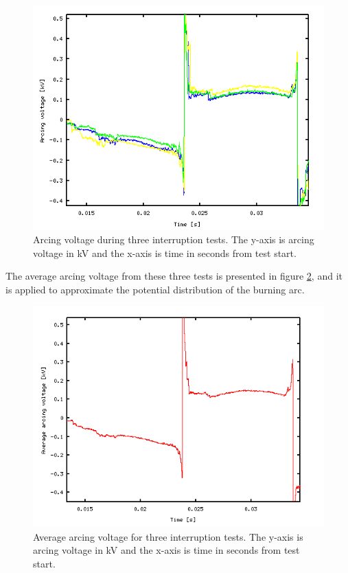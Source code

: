 \documentclass[10pt,b5paper,twoside]{article}
\begin{document}
\begin{figure}[H]
\centering
\includegraphics[scale=0.56]{Bilder/Theory/threeTests.png}
\caption{Arcing voltage during three interruption tests. The y-axis is arcing voltage in kV and the x-axis is time in seconds from test start.} \label{fig:threeTests}
\end{figure}

The average arcing voltage from these three tests is presented in figure \ref{fig:averageArcingVoltage}, and it is applied to approximate the potential distribution of the burning arc.

\begin{figure}[H]
\centering
\includegraphics[scale=0.56]{Bilder/Theory/averageOfthreeTests.png}
\caption{Average arcing voltage for three interruption tests. The y-axis is arcing voltage in kV and the x-axis is time in seconds from test start.} \label{fig:averageArcingVoltage}
\end{figure}
\end{document}
